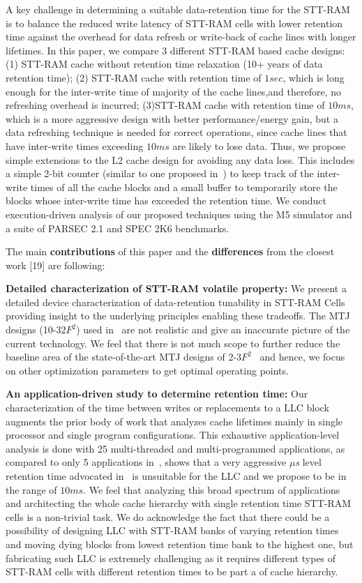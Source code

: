 A key challenge in determining a suitable data-retention time for the STT-RAM is to balance the
reduced write latency of STT-RAM cells with lower retention time against the overhead for data refresh or
write-back of cache lines with longer lifetimes. In this paper, we compare 3 different STT-RAM based
cache designs: (1) STT-RAM cache without retention time relaxation (10+ years of data retention
time); (2) STT-RAM cache with retention time of $1sec$, which is long enough for the inter-write time of
majority of the cache lines,and therefore, no refreshing overhead is incurred; (3)STT-RAM cache with
retention time of $10ms$, which is a more aggressive design with better performance/energy gain, but a
data refreshing technique is needed for correct operations, since cache lines that have inter-write times
exceeding $10ms$ are likely to lose data. Thus, we propose simple extensions to the L2 cache design
for avoiding any data loss. This includes a simple 2-bit counter (similar to one proposed
in~\cite{cache-decay-2001}) to keep track of the inter-write times of all the cache blocks and a small buffer
to temporarily store the blocks whose inter-write time has exceeded the retention time. We conduct
execution-driven analysis of our proposed techniques using the M5 simulator and
a suite of PARSEC 2.1 and
SPEC 2K6 benchmarks. 

The main {\bf contributions} of this paper and the {\bf differences} from the closest work [19] are following:

\noindent\textbf{Detailed characterization of STT-RAM volatile property:} We present a detailed
device characterization of data-retention tunability in STT-RAM Cells providing insight to the
underlying principles enabling these tradeoffs. The MTJ designs (10-32$F^2$) used in~\cite{STTRAM:HPCA11}  are not realistic
and give an inaccurate picture of the current technology. We feel that there is not much scope to
further reduce the baseline area of the state-of-the-art MTJ designs of 2-3$F^2$~\cite{STTRAM:Grandis11} and hence, we focus
on other optimization parameters to get optimal operating points. 

\noindent\textbf{An application-driven study to determine retention time:}
Our characterization of the time between writes or replacements to a LLC block
augments the prior body of work that analyzes cache lifetimes mainly in
single processor and single program configurations. This exhaustive application-level analysis is done with
25 multi-threaded and multi-programmed applications, as compared to only 5 applications in~\cite{STTRAM:HPCA11},
shows that a very aggressive {\it $\mu$s} level retention time advocated in~\cite{STTRAM:HPCA11} is
unsuitable for the LLC and we propose to be in the range of $10ms$.
We feel that analyzing this broad spectrum of applications and architecting the 
whole cache hierarchy with single retention time STT-RAM cells is a non-trivial task.
We do acknowledge the fact that there could be a possibility of designing LLC with STT-RAM banks of varying 
retention times and moving dying blocks from lowest retention time bank to the highest one, but fabricating 
such LLC is extremely challenging as it requires different types of STT-RAM cells with different retention times 
to be part a of cache hierarchy.
 

